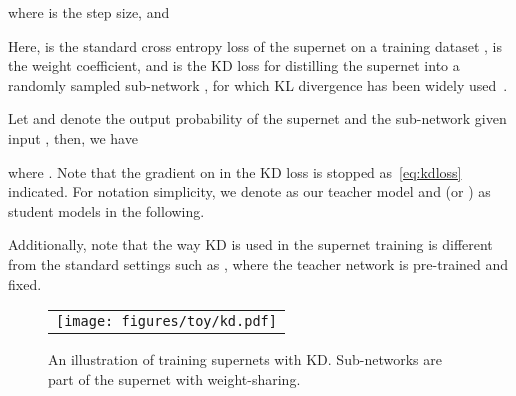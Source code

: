 \documentclass{article}
\newcommand{\qq}[1]{{\small\red{[QL:~#1]}}}
\begin{document}
where  is the step size, and

Here,  is the standard cross entropy loss of the supernet on a training dataset ,  is the weight coefficient, and  is the KD loss for distilling the supernet into a randomly sampled sub-network , for which KL divergence has been widely used~\citep[e.g.,][]{yu2020bignas}.

Let  and  denote the output probability of the supernet and the sub-network  given input , then, we have

where . Note that the gradient on  in the KD loss is stopped as~\eqref{eq:kdloss} indicated. For notation simplicity, 
we denote  as our teacher model and  (or ) as student models in the following. 

Additionally, note that the way KD is used in the supernet training is different from the standard settings such as \citet[e.g.,][]{hinton2015distilling}, where the teacher network is pre-trained and fixed.



\iffalse
Given the weight-sharing parameter  and the architecture space , we denote  as the parameter for a sub-network  and define  and  as the largest and smallest sub-network in . Mark the training set as ,
the training objective is

\qq{does the algorithm actually optimize a single object, or it is actually an iterative algorithm that does not optimize any object? Otherwise there will be stop gradient issues on the KD loss.}
\qq{ is strange. Write  where  is a fixed sampling distribution on ?}
where  is a coefficient,  is a uniform sampler for all candidate  in ,  is the output of sub-network ,  denotes supervised loss while  denotes the knowledge distillation loss.
Here,  is trained with  and under the supervision of the label  from .
The other architectures  (including ) is trained with , the soft label provided by the biggest sub-network . 
Overall, the objective contains two parts.
The first part is the expectation of the KD loss over all the architecture . The second term is called as sandwich rule, which introduces the supervised loss for the biggest and KD loss for smallest sub-network.
In practice, equation \eqref{eq:loss} is optimized under a stochastic version with gradient descent, where random samples of  and  is drawn for each gradient descent step.
\fi


\begin{figure}[tb]
\centering
\begin{tabular}{c}
\texttt{[image: figures/toy/kd.pdf]} \\
\end{tabular}
\caption{An illustration of training supernets with KD. Sub-networks are part of the supernet with weight-sharing. }
\label{fig:supernet_kd}
\end{figure}
 
\end{document}
